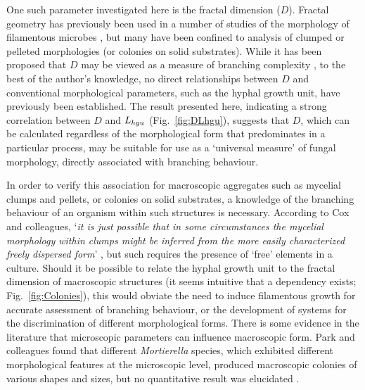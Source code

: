 One such parameter investigated here is the fractal dimension ($D$). Fractal geometry has previously been used in a number of studies of the morphology of filamentous microbes \cite{obert1990,papagianni2006b,jones1997,boddy2008,hitchcock1996,golinski2008}, but many have been confined to analysis of clumped or pelleted morphologies (or colonies on solid substrates). While it has been proposed that $D$ may be viewed as a measure of branching complexity \cite{jones1997}, to the best of the author's knowledge, no direct relationships between $D$ and conventional morphological parameters, such as the hyphal growth unit, have previously been established. The result presented here, indicating a strong correlation between $D$ and $L_{hgu}$ (Fig.~\ref{fig:DLhgu}), suggests that $D$, which can be calculated regardless of the morphological form that predominates in a particular process, may be suitable for use as a \lq universal measure' of fungal morphology, directly associated with branching behaviour.

In order to verify this association for macroscopic aggregates such as mycelial clumps and pellets, or colonies on solid substrates, a knowledge of the branching behaviour of an organism within such structures is necessary. According to Cox and colleagues, \lq \emph{it is just possible that in some circumstances the mycelial morphology within clumps might be inferred from the more easily characterized freely dispersed form}' \cite{cox1998}, but such requires the presence of \lq free' elements in a culture. Should it be possible to relate the hyphal growth unit to the fractal dimension of macroscopic structures (it seems intuitive that a dependency exists; Fig.~\ref{fig:Colonies}), this would obviate the need to induce filamentous growth for accurate assessment of branching behaviour, or the development of systems for the discrimination of different morphological forms. There is some evidence in the literature that microscopic parameters can influence macroscopic form. Park and colleagues found that different \emph{Mortierella} species, which exhibited different morphological features at the microscopic level, produced macroscopic colonies of various shapes and sizes, but no quantitative result was elucidated \cite{eypark2006}.

